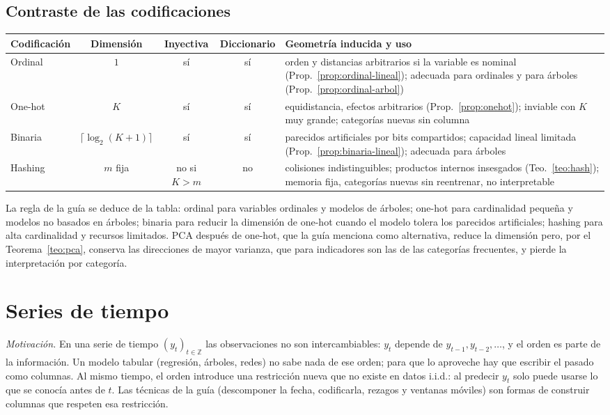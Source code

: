 \documentclass[11pt]{article}
\theoremstyle{definition}
\theoremstyle{remark}
\begin{document}
\subsection{Contraste de las codificaciones}\label{sec:contraste-cat}

\begin{center}
\begin{tabularx}{\linewidth}{@{}lcccY@{}}
\toprule
Codificación & Dimensión & Inyectiva & Diccionario & Geometría inducida y uso\\
\midrule
Ordinal & $1$ & sí & sí & orden y distancias arbitrarios si la variable es nominal (Prop.~\ref{prop:ordinal-lineal}); adecuada para ordinales y para árboles (Prop.~\ref{prop:ordinal-arbol})\\
One-hot & $K$ & sí & sí & equidistancia, efectos arbitrarios (Prop.~\ref{prop:onehot}); inviable con $K$ muy grande; categorías nuevas sin columna\\
Binaria & $\lceil\log_2(K+1)\rceil$ & sí & sí & parecidos artificiales por bits compartidos; capacidad lineal limitada (Prop.~\ref{prop:binaria-lineal}); adecuada para árboles\\
Hashing & $m$ fija & no si $K>m$ & no & colisiones indistinguibles; productos internos insesgados (Teo.~\ref{teo:hash}); memoria fija, categorías nuevas sin reentrenar, no interpretable\\
\bottomrule
\end{tabularx}
\end{center}

\noindent La regla de la guía se deduce de la tabla: ordinal para variables ordinales y modelos de árboles; one-hot para cardinalidad pequeña y modelos no basados en árboles; binaria para reducir la dimensión de one-hot cuando el modelo tolera los parecidos artificiales; hashing para alta cardinalidad y recursos limitados. PCA después de one-hot, que la guía menciona como alternativa, reduce la dimensión pero, por el Teorema~\ref{teo:pca}, conserva las direcciones de mayor varianza, que para indicadores son las de las categorías frecuentes, y pierde la interpretación por categoría.

\section{Series de tiempo}\label{sec:series}

\noindent \emph{Motivación.} En una serie de tiempo $(y_t)_{t\in\mathbb Z}$ las observaciones no son intercambiables: $y_t$ depende de $y_{t-1},y_{t-2},\dots$, y el orden es parte de la información. Un modelo tabular (regresión, árboles, redes) no sabe nada de ese orden; para que lo aproveche hay que escribir el pasado como columnas. Al mismo tiempo, el orden introduce una restricción nueva que no existe en datos i.i.d.: al predecir $y_t$ solo puede usarse lo que se conocía antes de $t$. Las técnicas de la guía (descomponer la fecha, codificarla, rezagos y ventanas móviles) son formas de construir columnas que respeten esa restricción.
\end{document}
